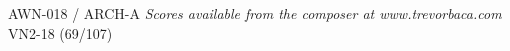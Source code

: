 \documentclass[11pt]{report}
\begin{document}
\null \vfill

AWN-018 / ARCH-A \hfill
\textit{Scores available from the composer at www.trevorbaca.com}
\hfill VN2-18 (69/107)
\end{document}
